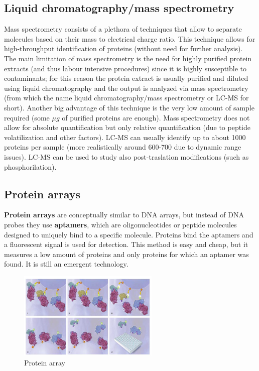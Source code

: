     \subsection{Liquid chromatography/mass spectrometry}
      Mass spectrometry consists of a plethora of techniques that allow to separate molecules based on their mass to electrical charge ratio. This technique allows for high-throughput identification of proteins (without need for further analysis). The main limitation of mass spectrometry is the need for highly purified protein extracts (and thus labour intensive procedures) since it is highly susceptible to contaminants; for this reason the protein extract is usually purified and diluted using liquid chromatography and the output is analyzed via mass spectrometry (from which the name liquid chromatography/mass spectrometry or LC-MS for short). Another big advantage of this technique is the very low amount of sample required (some $\mu g$ of purified proteins are enough). Mass spectrometry does not allow for absolute quantification but only relative quantification (due to peptide volatilization and other factors). LC-MS can usually identify up to about 1000 proteins per sample (more realistically around 600-700 due to dynamic range issues). LC-MS can be used to study also post-traslation modifications (such as phosphorilation).

    \subsection{Protein arrays}
      \textbf{Protein arrays} are conceptually similar to DNA arrays, but instead of DNA probes they use \textbf{aptamers}, which are oligonucleotides or peptide molecules designed to uniquely bind to a specific molecule. Proteins bind the aptamers and a fluorescent signal is used for detection. This method is easy and cheap, but it measures a low amount of proteins and only proteins for which an aptamer was found. It is still an emergent technology.

      \begin{figure}[h]
      \caption{Protein array}
      \centering
      \includegraphics[width=0.6\textwidth]{ProteinArray}
      \end{figure}
    
